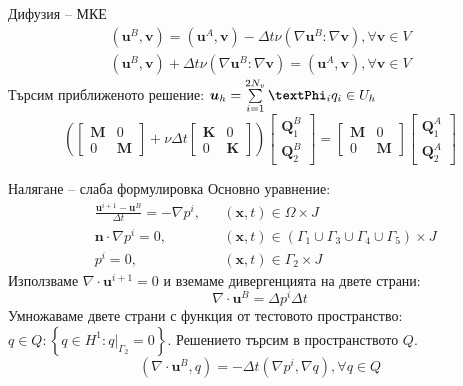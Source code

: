 \documentclass{beamer}
\newcommand{\dotprod}[2]{\left(#1, #2\right)}
\newcommand{\divg}[1]{\nabla\cdot#1}
\newcommand{\grad}[1]{\nabla#1}
\newcommand{\lapl}[1]{\Delta#1}
\newcommand{\vecf}[1]{\boldsymbol{#1}}
\begin{document}
\begin{frame}{Дифузия -- МКЕ}
	\begin{align*}
		\dotprod{\vecf{u}^B}{\vecf{v}} = \dotprod{\vecf{u}^A}{\vecf{v}} - \Delta t \nu\left(\grad{\vecf{u}^B} : \grad{\vecf{v}}\right), \forall\vecf{v} \in V \\
		\dotprod{\vecf{u}^B}{\vecf{v}} + \Delta t \nu\left(\grad{\vecf{u}^B} : \grad{\vecf{v}}\right) = \dotprod{\vecf{u}^A}{\vecf{v}}, \forall\vecf{v} \in V
	\end{align*}
	Търсим приближеното решение: $\vecf{u}_h = \sum\limits_{i=1}^{2N_v}{\textbf{\textPhi}_iq_i} \in U_h$
	$$
	\left(\begin{bmatrix}
		\mathbf{M} & 0 \\
		0 & \mathbf{M}
	\end{bmatrix} + \nu\Delta t\begin{bmatrix}
		\mathbf{K} & 0 \\
		0 & \mathbf{K}
	\end{bmatrix}\right)\begin{bmatrix}
		\vecf{Q}^{B}_1 \\
		\vecf{Q}^{B}_2
	\end{bmatrix} = \begin{bmatrix}
		\mathbf{M} & 0 \\
		0 & \mathbf{M}
	\end{bmatrix}\begin{bmatrix}
		\vecf{Q}^{A}_1 \\
		\vecf{Q}^{A}_2
	\end{bmatrix}
	$$

\end{frame}

\begin{frame}{Налягане -- слаба формулировка}
	Основно уравнение:
	\begin{align*}
		&\frac{\vecf{u}^{i+1} - \vecf{u}^B}{\Delta t} = -\nabla p^i, &&\left(\vecf{x}, t\right) \in \Omega \times J\\
		&\vecf{n} \cdot \grad{p^i} = 0, && \left(\vecf{x}, t\right) \in (\Gamma_1 \cup \Gamma_3 \cup \Gamma_4 \cup \Gamma_5) \times J \\
		&p^i = 0, && \left(\vecf{x}, t\right) \in \Gamma_2 \times J
	\end{align*}
	Използваме $\nabla \cdot \textbf{u}^{i+1} = 0$ и вземаме дивергенцията на двете страни:
	$$
		\divg{\vecf{u}^B} = \lapl{p^i} \Delta t
	$$
	Умножаваме двете страни с функция от тестовото пространство: $q \in Q : \left\{q \in H^1 : q|_{\Gamma_2} = 0\right\}$. Решението търсим в пространството $Q$.
	$$
		\dotprod{\divg{\vecf{u}^B}}{q} = - \Delta t \dotprod{\grad{p^i}}{\grad{q}}, \forall q \in Q
	$$
\end{frame}
\end{document}
